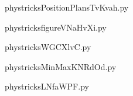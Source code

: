     

    \clearpage
    


    \newcommand{\CaptionFigPositionPlansTvKvah}{<+Type your caption here+>}
    \begin{center}
        
    \end{center}
    phystricksPositionPlansTvKvah.py

    

    \clearpage
    


    \newcommand{\CaptionFigfigureVNaHvXi}{<+Type your caption here+>}
    \begin{center}
        
    \end{center}
    phystricksfigureVNaHvXi.py

    

    \clearpage
    


    \newcommand{\CaptionFigWGCXlvC}{<+Type your caption here+>}
    \begin{center}
        
    \end{center}
    phystricksWGCXlvC.py

    

    \clearpage
    


    \newcommand{\CaptionFigMinMaxKNRdOd}{<+Type your caption here+>}
    \begin{center}
        
    \end{center}
    phystricksMinMaxKNRdOd.py

    

    \clearpage
    


    \newcommand{\CaptionFigLNfaWPF}{<+Type your caption here+>}
    \begin{center}
        
    \end{center}
    phystricksLNfaWPF.py

    

    \clearpage
    


